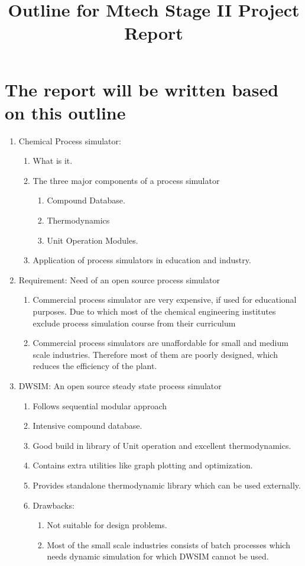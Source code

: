 \documentclass[12pt]{article}
\title{Outline for Mtech Stage II Project Report}
\author{}
\date{}
\begin{document}
\maketitle
\section{The report will be written based on this outline}
\begin{enumerate}
\item Chemical Process simulator:
\begin{enumerate}[label*=\arabic*.]
\item What is it.
\item The three major components of a process simulator
\begin{enumerate}[label*=\arabic*.]
\item Compound Database.
\item Thermodynamics
\item Unit Operation Modules.
\end{enumerate}
\item Application of process simulators in education and industry. 
\end{enumerate}

\item Requirement: Need of an open source process simulator
\begin{enumerate}[label*=\arabic*.]
\item Commercial process simulator are very expensive, if used for educational purposes. Due to which most of the chemical engineering institutes exclude process simulation course from their curriculum
\item Commercial process simulators are unaffordable for small and medium scale industries. Therefore most of them are poorly designed, which reduces the efficiency of the plant.
\end{enumerate}

\item DWSIM: An open source steady state process simulator
\begin{enumerate}[label*=\arabic*.]
\item Follows sequential modular approach
\item Intensive compound database.
\item Good build in library of Unit operation and excellent thermodynamics.
\item Contains extra utilities like graph plotting and optimization.
\item Provides standalone thermodynamic library which can be used externally.
\item Drawbacks: 
\begin{enumerate}[label*=\arabic*.]
\item Not suitable for design problems.
\item Most of the small scale industries consists of batch processes which needs dynamic simulation for which DWSIM cannot be used.
\end{enumerate}
\end{enumerate}



\end{enumerate}
\end{document}

